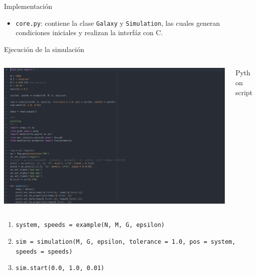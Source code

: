 \documentclass{beamer}
\begin{document}
\begin{frame}{Implementaci\'on}
	\begin{tcolorbox}[colback=blue!5,colframe=blue!40!black,title=Python]
		\begin{itemize}
			\item \texttt{core.py}: contiene la clase \texttt{Galaxy} y \texttt{Simulation}, las cuales generan condiciones iniciales y realizan la interf\'az con C.
		\end{itemize}
	\end{tcolorbox}
\end{frame}
\begin{frame}{Ejecuci\'on de la simulaci\'on}
	\begin{columns}
		\begin{column}{0.75\textwidth}
			\includegraphics[height=0.5\textheight]{sources/images/code.png}
		\end{column}
		\begin{column}{0.25\textwidth}
			Python script
		\end{column}
	\end{columns}
	\begin{enumerate}
		\item \texttt{system, speeds = example(N, M, G, epsilon)} \pause
		\item {\footnotesize\texttt{sim = simulation(M, G, epsilon, tolerance = 1.0, pos = system, speeds = speeds)}} \pause
		\item \texttt{sim.start(0.0, 1.0, 0.01)}
	\end{enumerate}
\end{frame}
\end{document}
